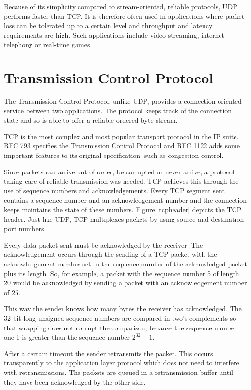 \documentclass[11pt,twoside,abstract,notitlepage]{scrreprt}
\begin{document}
Because of its simplicity compared to stream-oriented, reliable protocols, UDP performs faster than TCP. It is therefore often used in applications where packet loss can be tolerated up to a certain level and throughput and latency requirements are high. Such applications include video streaming, internet telephony or real-time games.

\section{Transmission Control Protocol} 
The Transmission Control Protocol, unlike UDP, provides a connection-oriented service between two applications. The protocol keeps track of the connection state  and so is able to offer a reliable ordered byte-stream. 

TCP is the most complex and most popular transport protocol in the IP suite. RFC 793 \cite{rfc793} specifies the Transmission Control Protocol and RFC 1122 \cite{rfc1122} adds some important features to its original specification, such as congestion control. 

Since packets can arrive out of order, be corrupted or never arrive, a protocol taking care of reliable transmission was needed. TCP achieves this through the use of sequence numbers and acknowledgements. Every TCP segment sent contains a sequence number and an acknowledgement number and the connection keeps maintains the state of these numbers. Figure \ref{tcpheader} depicts the TCP header. Just like UDP, TCP multiplexes packets by using source and destination port numbers. 

 Every data packet sent must be acknowledged by the receiver. The acknowledgement occurs through the sending of a TCP packet with the acknowledgement number set to the sequence number of the acknowledged packet plus its length. So, for example, a packet with the sequence number 5 of length 20 would be acknowledged by sending a packet with an acknowledgement number of 25.

This way the sender knows how many bytes the receiver has acknowledged. The 32-bit long unsigned sequence numbers are compared in two's complements so that wrapping does not corrupt the comparison, because the sequence number one 1 is greater than the sequence number $2^{32}-1$.
 
After a certain timeout the sender retransmits the packet. This occurs transparently to the application layer protocol which does not need to interfere with retransmissions. The packets are queued in a retransmission buffer until they have been acknowledged by the other side.
\end{document}
